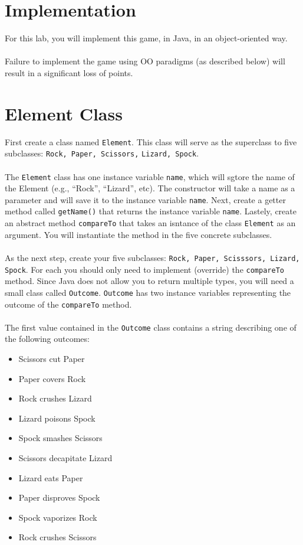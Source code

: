 \documentclass{article}
\begin{document}
\section*{Implementation}
For this lab, you will implement this game, in Java, in an object-oriented way.
\\\\
\noindent Failure to implement the game using OO paradigms (as described below) will result in a significant loss of points.

\section*{Element Class}
First create a class named \verb|Element|. This class will serve as the superclass to five subclasses: \verb|Rock, Paper, Scissors,| \verb|Lizard, Spock|.
\\\\
\noindent The \verb|Element| class has one instance variable \verb|name|, which will sgtore the name of the Element (e.g., ``Rock'', ``Lizard'', etc). The constructor will take a name as a parameter and will save it to the instance variable \verb|name|. Next, create a getter method called \verb|getName()| that returns the instance variable \verb|name|. Lastely, create an abstract method \verb|compareTo| that takes an isntance of the class \verb|Element| as an argument. You will instantiate the method in the five concrete subclasses.
\\\\
\noindent As the next step, create your five subclasses: \verb|Rock, Paper, Scisssors, Lizard, Spock|. For each you should only need to implement (override) the \verb|compareTo| method. Since Java does not allow you to return multiple types, you will need a small class called \verb|Outcome|. \verb|Outcome| has two instance variables representing the outcome of the \verb|compareTo| method.
\\\\
\noindent The first value contained in the \verb|Outcome| class contains a string describing one of the following outcomes:
\begin{multicols}{2}
 \begin{itemize}
  \item Scissors cut Paper
  \item Paper covers Rock
  \item Rock crushes Lizard
  \item Lizard poisons Spock
  \item Spock smashes Scissors
  \item Scissors decapitate Lizard
  \item Lizard eats Paper
  \item Paper disproves Spock
  \item Spock vaporizes Rock
  \item Rock crushes Scissors
 \end{itemize}

\end{multicols}
\end{document}
